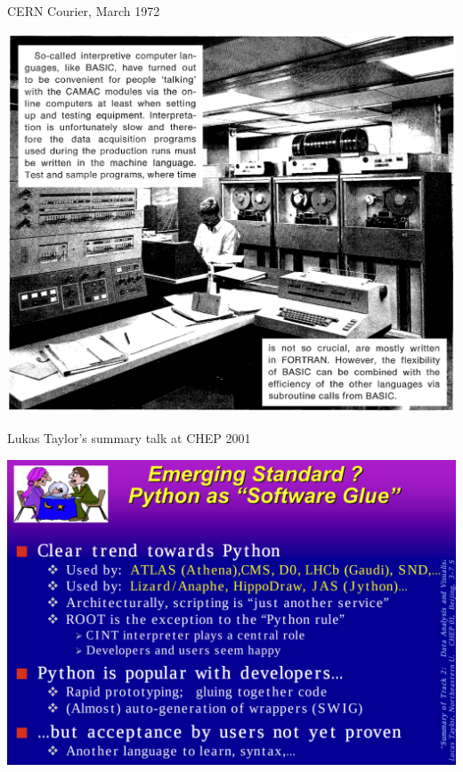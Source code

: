 \documentclass[aspectratio=169]{beamer}
\begin{document}
\begin{frame}{CERN Courier, March 1972}
\vspace{0.2 cm}
\begin{center}
\includegraphics[width=0.65\linewidth]{img/cern-courier-basic.png}
\end{center}
\end{frame}

\begin{frame}{Lukas Taylor's summary talk at CHEP 2001}
\vspace{0.2 cm}
\begin{center}
\includegraphics[width=0.8\linewidth]{img/chep-2001-python.png}
\end{center}
\end{frame}
\end{document}
